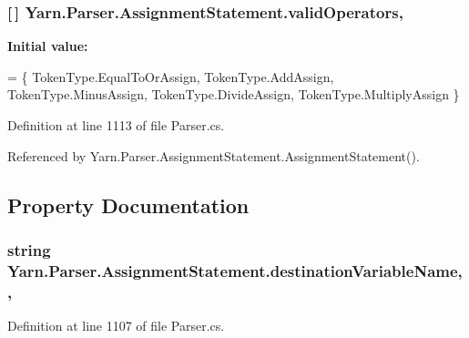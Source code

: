 \hypertarget{a00039_af3d393da2f684272251805d3471b6c7a}{
\subsubsection[{valid\-Operators}]{ \mbox{[}$\,$\mbox{]} Yarn.\-Parser.\-Assignment\-Statement.\-valid\-Operators\hspace{0.3cm}{\ttfamily [static]}, {\ttfamily [private]}}}\label{a00039_af3d393da2f684272251805d3471b6c7a}
{\bfseries Initial value\-:}
\begin{DoxyCode}
= \{
                TokenType.EqualToOrAssign,
                TokenType.AddAssign,
                TokenType.MinusAssign,
                TokenType.DivideAssign,
                TokenType.MultiplyAssign
            \}
\end{DoxyCode}


Definition at line 1113 of file Parser.\-cs.



Referenced by Yarn.\-Parser.\-Assignment\-Statement.\-Assignment\-Statement().



\subsection{Property Documentation}
\hypertarget{a00039_a4e764622b716a4138d1fd9e005c41336}{
\subsubsection[{destination\-Variable\-Name}]{\setlength{\rightskip}{0pt plus 5cm}string Yarn.\-Parser.\-Assignment\-Statement.\-destination\-Variable\-Name\hspace{0.3cm}{\ttfamily [get]}, {\ttfamily [set]}, {\ttfamily [package]}}}\label{a00039_a4e764622b716a4138d1fd9e005c41336}


Definition at line 1107 of file Parser.\-cs.



